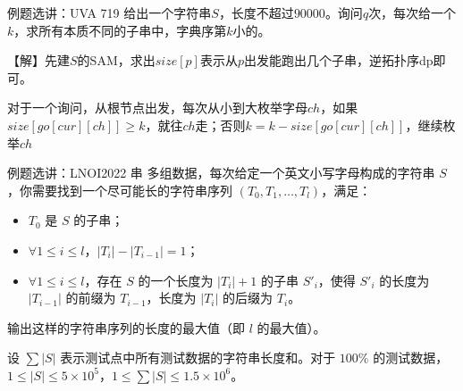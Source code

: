 \documentclass{beamer}
\begin{document}
\begin{frame}{例题选讲：UVA 719}
    \small
    给出一个字符串$S$，长度不超过$90000$。询问$q$次，每次给一个$k$，求所有本质不同的子串中，字典序第$k$小的。

    \pause \vspace{1em}
    【解】先建$S$的SAM，求出$size[p]$表示从$p$出发能跑出几个子串，逆拓扑序dp即可。

    \pause \vspace{1em}
    对于一个询问，从根节点出发，每次从小到大枚举字母$ch$，如果$size[go[cur][ch]]\geq k$，就往$ch$走；否则$k=k-size[go[cur][ch]]$，继续枚举$ch$
\end{frame}

\begin{frame}{例题选讲：LNOI2022 串}
    \small
多组数据，每次给定一个英文小写字母构成的字符串 $S$，你需要找到一个尽可能长的字符串序列 $(T_0, T_1, \ldots, T_l)$，满足：

\begin{itemize}
\item $T_0$ 是 $S$ 的子串；
\item $\forall 1 \le i \le l$，$\lvert T_i \rvert - \lvert T_{i - 1} \rvert = 1$；
\item $\forall 1 \le i \le l$，存在 $S$ 的一个长度为 $\lvert T_i \rvert + 1$ 的子串 $S'_i$，使得 $S'_i$ 的长度为 $\lvert T_{i - 1} \rvert$ 的前缀为 $T_{i - 1}$，长度为 $\lvert T_i \rvert$ 的后缀为 $T_i$。
\end{itemize}

输出这样的字符串序列的长度的最大值（即 $l$ 的最大值）。

\vspace{1em}

设 $\sum |S|$ 表示测试点中所有测试数据的字符串长度和。对于 $100 \%$ 的测试数据，$1 \le \lvert S \rvert \le 5 \times {10}^5$，$1 \le \sum \lvert S \rvert \le 1.5 \times {10}^6$。

\end{frame}
\end{document}
